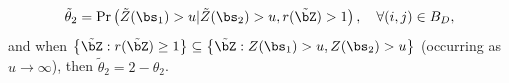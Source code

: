 \documentclass[12pt]{article}
\begin{document}
\begin{equation*}
\tilde{\theta}_{2} = 
\Pr\left(\tilde{Z}(\bs_1)>u|\tilde{Z}(\bs_2)>u, r(\tilde{\bZ})>1\right), \quad \forall (i,j) \in B_D, 
\end{equation*}
%
and when $\left\{ \tilde{\bZ}: r(\tilde{\bZ}) \geq 1 \right\} \subseteq \left\{ \tilde{\bZ}: Z(\bs_1) >u, Z(\bs_2) >u \right\}$ (occurring as $u\rightarrow \infty$), then $\tilde{\theta}_{2} = 2 - \theta_{2}$. 
%
\end{document}
